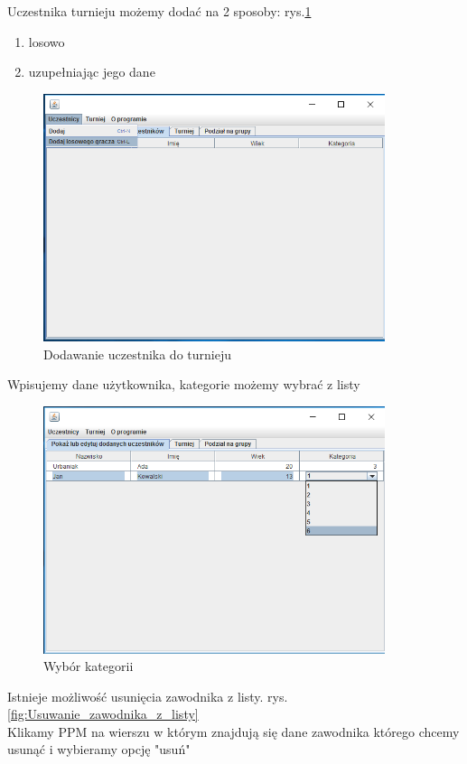Uczestnika turnieju możemy dodać na 2 sposoby: rys.\ref{fig:dodawanie_uczestnika_do_turnieju}
\begin{enumerate}
	\item losowo
	\item uzupełniając jego dane
\end{enumerate}
\begin{figure}[H]
	\centering
	\includegraphics[width=10cm]{fig/4}
	\caption{Dodawanie uczestnika do turnieju}
	\label {fig:dodawanie_uczestnika_do_turnieju} 
\end{figure}
Wpisujemy dane użytkownika, kategorie możemy wybrać z listy
\begin{figure}[H]
	\centering
	\includegraphics[width=10cm]{fig/5}
	\caption{Wybór kategorii}
	\label {fig:wybor_kategorii} 
\end{figure}
Istnieje możliwość usunięcia zawodnika z listy. rys.\ref{fig:Usuwanie_zawodnika_z_listy}\\
Klikamy PPM na wierszu w którym znajdują się dane zawodnika którego chcemy usunąć i wybieramy opcję "usuń" 

